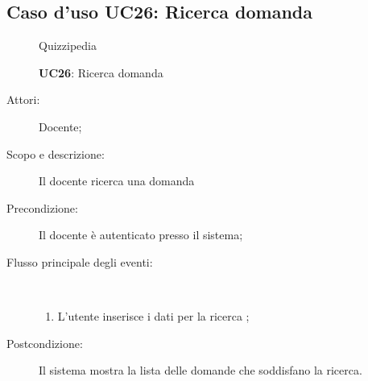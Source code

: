 \subsection{Caso d'uso UC26: Ricerca domanda}
	\begin{figure}[H]
		\centering
		\begin{resizedtikzpicture}{\textwidth}
		\begin{umlsystem}[x=0, fill=lightgray!20]{Quizzipedia}
		\end{umlsystem}
		\end{resizedtikzpicture}
		\caption{\textbf{UC26}: Ricerca domanda}
		\label{UC26}
	\end{figure}
\begin{description}
\item[Attori:] Docente;
\item[Scopo e descrizione:] Il docente ricerca una domanda
      \item[Precondizione:] Il docente è autenticato presso il sistema;

        \item[Flusso principale degli eventi:] \ 
 \begin{enumerate}
          \item L'utente inserisce i dati per la ricerca	;

      \end{enumerate}
    \item[Postcondizione:] Il sistema mostra la lista delle domande che soddisfano la ricerca.
  \end{description}
\hypertarget{UC27}{}
